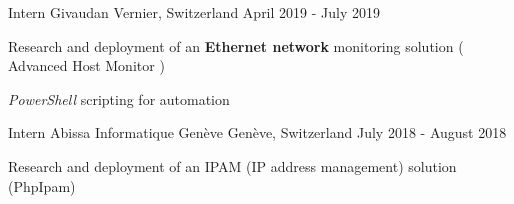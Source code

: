 \begin{cventries}
	\cventry
	{Intern} %
	{Givaudan} %
	{Vernier, Switzerland} %
	{April 2019 - July 2019} %
	{
		\begin{cvitems} %
		\item {Research and deployment of an \textbf{Ethernet network} monitoring solution ( Advanced Host Monitor )}
		\item {\emph{PowerShell} scripting for automation}
		\end{cvitems}
	}

	\cventry
	{Intern} %
	{Abissa Informatique Genève} %
	{Genève, Switzerland} %
	{July 2018 - August 2018} %
	{
		\begin{cvitems} %
		\item {Research and deployment of an IPAM (IP address management) solution (PhpIpam)}
		\end{cvitems}
	}
\end{cventries}
